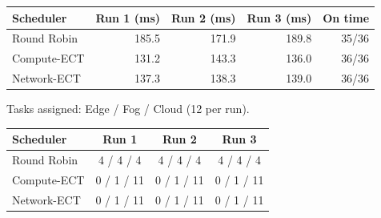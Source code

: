 \begin{table}[H]
\centering
\label{table:example-b:start}
\begin{tabular}{lrrrr}
\toprule
\textbf{Scheduler} & \textbf{Run 1 (ms)} & \textbf{Run 2 (ms)} & \textbf{Run 3 (ms)} & \textbf{On time} \\
\midrule
Round Robin & 185.5 & 171.9 & 189.8 & 35/36 \\
Compute-ECT & 131.2 & 143.3 & 136.0 & 36/36 \\
Network-ECT & 137.3 & 138.3 & 139.0 & 36/36 \\
\bottomrule
\end{tabular}
\par\smallskip
{\small Tasks assigned: Edge / Fog / Cloud (12 per run).}\par\smallskip
\begin{tabular}{lccc}
\toprule
\textbf{Scheduler} & \textbf{Run 1} & \textbf{Run 2} & \textbf{Run 3} \\
\midrule
Round Robin & 4 / 4 / 4 & 4 / 4 / 4 & 4 / 4 / 4 \\
Compute-ECT & 0 / 1 / 11 & 0 / 1 / 11 & 0 / 1 / 11 \\
Network-ECT & 0 / 1 / 11 & 0 / 1 / 11 & 0 / 1 / 11 \\
\bottomrule
\end{tabular}
\label{table:example-b:end}
\end{table}
